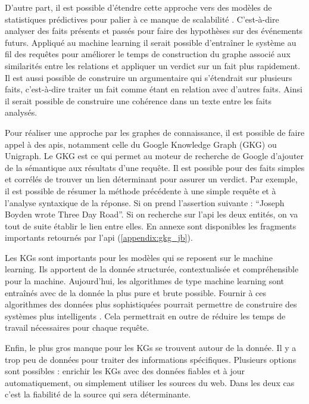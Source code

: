D'autre part, il est possible d'étendre cette approche vers des modèles de statistiques prédictives pour palier à ce manque de scalabilité \cite{wilcke2017knowledge}. C'est-à-dire analyser des faits présents et passés pour faire des hypothèses sur des événements futurs. Appliqué au machine learning il serait possible d'entraîner le système au fil des requêtes pour améliorer le temps de construction du graphe associé aux similarités entre les relations et appliquer un verdict sur un fait plus rapidement. Il est aussi possible de construire un argumentaire qui s'étendrait sur plusieurs faits, c'est-à-dire traiter un fait comme étant en relation avec d'autres faits. Ainsi il serait possible de construire une cohérence dans un texte entre les faits analysés.

Pour réaliser une approche par les graphes de connaissance, il est possible de faire appel à des apis, notamment celle du Google Knowledge Graph (GKG) ou Unigraph. Le GKG est ce qui permet au moteur de recherche de Google d'ajouter de la sémantique aux résultats d'une requête. Il est possible pour des faits simples et corrélés de trouver un lien déterminant pour assurer un verdict. Par exemple, il est possible de résumer la méthode précédente à une simple requête et à l'analyse syntaxique de la réponse. Si on prend l'assertion suivante : \enquote{Joseph Boyden wrote Three Day Road}. Si on recherche sur l'api les deux entités, on va tout de suite établir le lien entre elles. En annexe sont disponibles les fragments importants retournés par l'api (\ref{appendix:gkg_jb}). 

Les KGs sont importants pour les modèles qui se reposent sur le machine learning. Ils apportent de la donnée structurée, contextualisée et compréhensible pour la machine. Aujourd'hui, les algorithmes de type machine learning sont entraînés avec de la donnée la plus pure et brute possible. Fournir à ces algorithmes des données plus sophistiquées pourrait permettre de construire des systèmes plus intelligents \cite{nickel2016review}. Cela permettrait en outre de réduire les temps de travail nécessaires pour chaque requête.

Enfin, le plus gros manque pour les KGs se trouvent autour de la donnée. Il y a trop peu de données pour traiter des informations spécifiques. Plusieurs options sont possibles : enrichir les KGs avec des données fiables et à jour automatiquement, ou simplement utiliser les sources du web. Dans les deux cas c'est la fiabilité de la source qui sera déterminante.